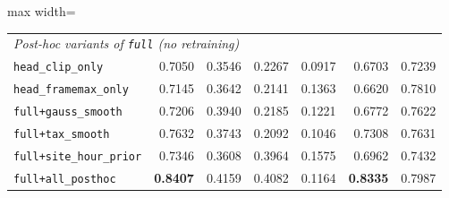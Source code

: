 \begin{table}[H]
\begin{adjustbox}{max width=\linewidth}
\begin{tabular}{lrrrrrr}
\multicolumn{7}{l}{\emph{Post-hoc variants of \texttt{full} (no retraining)}} \\
\texttt{head\_clip\_only} & 0.7050 & 0.3546 & 0.2267 & 0.0917 & 0.6703 & 0.7239 \\
\texttt{head\_framemax\_only} & 0.7145 & 0.3642 & 0.2141 & 0.1363 & 0.6620 & 0.7810 \\
\texttt{full+gauss\_smooth} & 0.7206 & 0.3940 & 0.2185 & 0.1221 & 0.6772 & 0.7622 \\
\texttt{full+tax\_smooth} & 0.7632 & 0.3743 & 0.2092 & 0.1046 & 0.7308 & 0.7631 \\
\texttt{full+site\_hour\_prior} & 0.7346 & 0.3608 & 0.3964 & 0.1575 & 0.6962 & 0.7432 \\
\texttt{full+all\_posthoc} & \textbf{0.8407} & 0.4159 & 0.4082 & 0.1164 & \textbf{0.8335} & 0.7987 \\
\bottomrule
\end{tabular}
\end{adjustbox}
\end{table}
